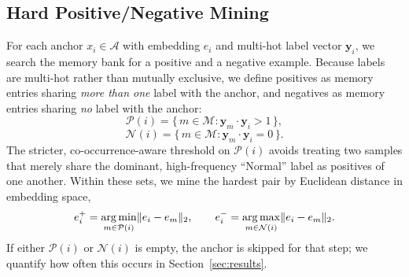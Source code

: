 \documentclass[conference]{IEEEtran}
\begin{document}
\subsection{Hard Positive/Negative Mining}
For each anchor $x_i \in \mathcal{A}$ with embedding $e_i$ and multi-hot label vector $\mathbf{y}_i$, we search the memory bank for a positive and a negative example. Because labels are multi-hot rather than mutually exclusive, we define positives as memory entries sharing \emph{more than one} label with the anchor, and negatives as memory entries sharing \emph{no} label with the anchor:
\begin{equation}
\mathcal{P}(i) = \{\, m \in \mathcal{M} : \mathbf{y}_m \cdot \mathbf{y}_i > 1 \,\},
\label{eq:posmask}
\end{equation}
\begin{equation}
\mathcal{N}(i) = \{\, m \in \mathcal{M} : \mathbf{y}_m \cdot \mathbf{y}_i = 0 \,\}.
\label{eq:negmask}
\end{equation}
The stricter, co-occurrence-aware threshold on $\mathcal{P}(i)$ avoids treating two samples that merely share the dominant, high-frequency ``Normal'' label as positives of one another. Within these sets, we mine the hardest pair by Euclidean distance in embedding space,
\begin{equation}
e_i^{+} = \operatornamewithlimits{arg\,min}_{m \in \mathcal{P}(i)} \lVert e_i - e_m \rVert_2, \qquad
e_i^{-} = \operatornamewithlimits{arg\,max}_{m \in \mathcal{N}(i)} \lVert e_i - e_m \rVert_2.
\label{eq:hardmine}
\end{equation}
If either $\mathcal{P}(i)$ or $\mathcal{N}(i)$ is empty, the anchor is skipped for that step; we quantify how often this occurs in Section~\ref{sec:results}.
\end{document}
